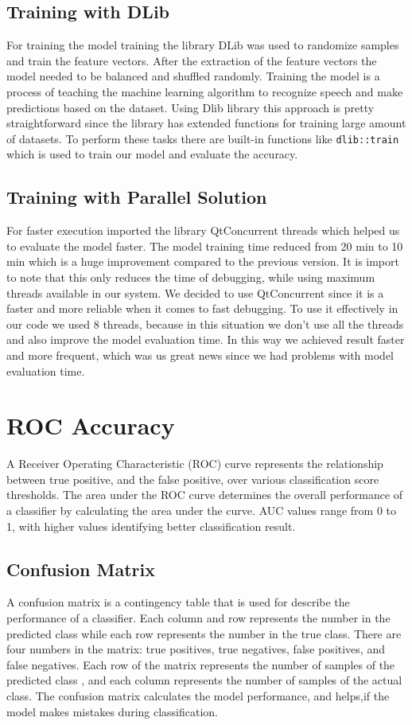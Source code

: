 \documentclass[english,12pt,oneside,a4paper]{article}
\begin{document}
		\subsection{Training with DLib}
		For training the model training the library DLib was used to randomize samples and train the feature vectors. After the extraction of the feature vectors the model needed to be balanced and shuffled randomly. Training the model is a process of teaching the machine learning algorithm to recognize speech and make predictions based on the dataset. Using Dlib library this approach is pretty straightforward since the library has extended functions for training large amount of datasets. To perform these tasks there are built-in functions like \texttt{dlib::train} which is used to train our model and evaluate the accuracy. 
		\subsection{Training with Parallel Solution}
		For faster execution imported the library QtConcurrent threads which helped us to evaluate the model faster. The model training time reduced from 20 min to 10 min which is a huge improvement compared to the previous version.
		It is import to note that this only reduces the time of debugging, while using maximum threads available in our system. We decided to use QtConcurrent since it is a faster and more reliable when it comes to fast debugging.
		To use it effectively in our code we used 8 threads, because in this situation we don't use all the threads and also improve the model evaluation time. In this way we achieved result faster and more frequent, which was us great news since we had problems with model evaluation time. 
		\section{ROC Accuracy}
		A Receiver Operating Characteristic (ROC) curve represents the relationship between true positive, and the false positive, over various classification score thresholds. The area under the ROC curve determines the overall performance of a classifier by calculating the area under the curve. AUC values range from 0 to 1, with higher values identifying better classification result.
		\subsection{Confusion Matrix}
		A confusion matrix  is a contingency table that is used for describe the performance of a classifier. Each column and row represents the number in the predicted class while each row represents the number in the true class.
		There are four numbers in the matrix: true positives, true negatives, false positives, and false negatives.
		Each row of the matrix represents the number of samples of the predicted class , and each column represents the number of samples of the actual class. The confusion matrix calculates the model performance, and helps,if the model makes mistakes during classification.
\end{document}
